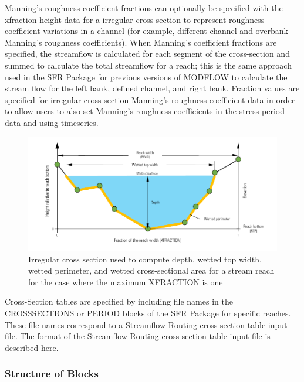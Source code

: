 Manning's roughness coefficient fractions can optionally be specified with the xfraction-height data for a irregular cross-section to represent roughness coefficient variations in a channel (for example, different channel and overbank Manning's roughness coefficients). When Manning's coefficient fractions are specified, the streamflow is calculated for each segment of the cross-section and summed to calculate the total streamflow for a reach; this is the same approach used in the SFR Package for previous versions of MODFLOW \citep{modflowsfr1pack} to calculate the stream flow for the left bank, defined channel, and right bank. Fraction values are specified for irregular cross-section Manning's roughness coefficient data in order to allow users to also set Manning's roughness coefficients in the stress period data and using timeseries.


\begin{figure}[ht]
	\centering
	\includegraphics[scale=1.0]{../Figures/n-point-cross-section}
	\caption[Illustration of a irregular cross section used to compute depth, wetted top width, wetted perimeter, and wetted cross-sectional area for a stream reach]{Irregular cross section used to compute depth, wetted top width, wetted perimeter, and wetted cross-sectional area for a stream reach for the case where the maximum XFRACTION is one}
	\label{fig:sfr-n-point}
\end{figure}

Cross-Section tables are specified by including file names in the CROSSSECTIONS or PERIOD blocks of the SFR Package for specific reaches.  These file names correspond to a Streamflow Routing cross-section table input file.  The format of the Streamflow Routing cross-section table input file is described here.

\vspace{5mm}
\subsubsection{Structure of Blocks}
\vspace{5mm}

